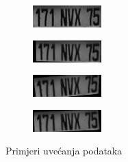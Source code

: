 \documentclass[times, utf8, diplomski]{fer}
\begin{document}
\begin{figure}[H]
    \centering
    \begin{subfigure}[b]{0.2\textwidth}
        \centering
        \includegraphics[width=\textwidth]{figures/augmentation/0.jpg}
    \end{subfigure}
    \hspace{0.1cm}
    \begin{subfigure}[b]{0.2\textwidth}
        \centering
        \includegraphics[width=\textwidth]{figures/augmentation/1.jpg}
    \end{subfigure}
    \hspace{0.1cm}
    \begin{subfigure}[b]{0.2\textwidth}
        \centering
        \includegraphics[width=\textwidth]{figures/augmentation/2.jpg}
    \end{subfigure}
    \hspace{0.1cm}
    \begin{subfigure}[b]{0.2\textwidth}
        \centering
        \includegraphics[width=\textwidth]{figures/augmentation/3.jpg}
    \end{subfigure}
    \caption{Primjeri uvećanja podataka}
    \label{fig:augmentation}
\end{figure}
\end{document}
